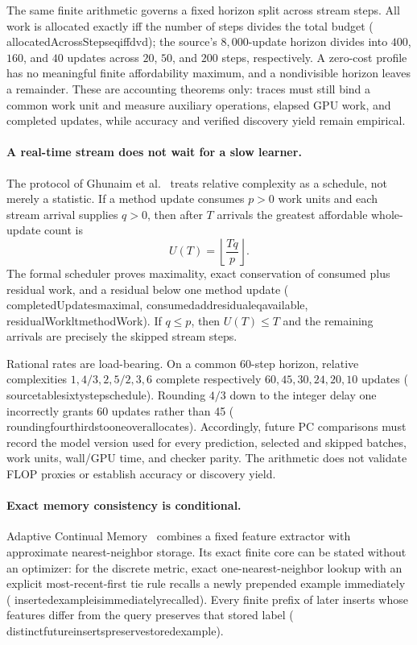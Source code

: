 \documentclass[11pt]{article}
\newcommand{\leanname}[1]{{\scriptsize\ttfamily
  \def\_{\textunderscore\allowbreak}#1}}
\begin{document}
The same finite arithmetic governs a fixed horizon split across stream steps.
All work is allocated exactly iff the number of steps divides the total
budget
(\leanname{allocatedAcrossSteps\_eq\_iff\_dvd}); the source's $8{,}000$-update
horizon divides into $400$, $160$, and $40$ updates across $20$, $50$, and
$200$ steps, respectively. A zero-cost profile has no meaningful finite
affordability maximum, and a nondivisible horizon leaves a remainder. These
are accounting theorems only: traces must still bind a common work unit and
measure auxiliary operations, elapsed GPU work, and completed updates, while
accuracy and verified discovery yield remain empirical.

\paragraph{A real-time stream does not wait for a slow learner.}
The protocol of Ghunaim et al.~\cite{ghunaim2023realtime} treats relative
complexity as a schedule, not merely a statistic. If a method update consumes
$p>0$ work units and each stream arrival supplies $q>0$, then after $T$
arrivals the greatest affordable whole-update count is
\[
  U(T)=\left\lfloor \frac{Tq}{p}\right\rfloor .
\]
The formal scheduler proves maximality, exact conservation of consumed plus
residual work, and a residual below one method update
(\leanname{completedUpdates\_maximal},
\leanname{consumed\_add\_residual\_eq\_available},
\leanname{residualWork\_lt\_methodWork}). If $q\le p$, then $U(T)\le T$ and
the remaining arrivals are precisely the skipped stream steps.

Rational rates are load-bearing. On a common 60-step horizon, relative
complexities $1,4/3,2,5/2,3,6$ complete respectively
$60,45,30,24,20,10$ updates
(\leanname{source\_table\_sixty\_step\_schedule}). Rounding $4/3$ down to the
integer delay one incorrectly grants 60 updates rather than 45
(\leanname{rounding\_four\_thirds\_to\_one\_overallocates}). Accordingly,
future PC comparisons must record the model version used for every
prediction, selected and skipped batches, work units, wall/GPU time, and
checker parity. The arithmetic does not validate FLOP proxies or establish
accuracy or discovery yield.

\paragraph{Exact memory consistency is conditional.}
Adaptive Continual Memory~\cite{prabhu2023acm} combines a fixed feature
extractor with approximate nearest-neighbor storage.  Its exact finite core
can be stated without an optimizer: for the discrete metric, exact
one-nearest-neighbor lookup with an explicit most-recent-first tie rule recalls
a newly prepended example immediately
(\leanname{inserted\_example\_is\_immediately\_recalled}).  Every finite prefix
of later inserts whose features differ from the query preserves that stored
label
(\leanname{distinct\_future\_inserts\_preserve\_stored\_example}).
\end{document}
